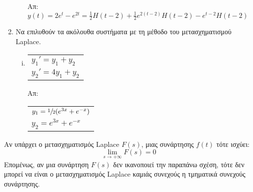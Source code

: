 \begin{enumerate}
\begin{enumerate}[i)]
        \hfill Απ: $y(t)=2e^t-e^{2t}=\frac{1}{2}H(t-2)+
        \frac{1}{2}e^{2(t-2)}H(t-2)-e^{t-2}H(t-2)$
    \end{enumerate}

  \item Να επιλυθούν τα ακόλουθα συστήματα με τη μέθοδο του μετασχηματισμού Laplace.
    \begin{enumerate}[i)]
      \item 
        \begin{tabular}{l} 
          $y_1'=y_1+y_2$ \\ $y_2'=4y_1+y_2$
        \end{tabular} 
        \hfill Απ: 
        \begin{tabular}{l} 
          $y_1=\sfrac{1}{2}(e^{3x}+e^{-x})$ \\ $y_2=e^{3x}+e^{-x}$
        \end{tabular}
    \end{enumerate}
\end{enumerate}

\vspace{\baselineskip}


\begin{rem}
Αν υπάρχει ο μετασχηματισμός Laplace $F(s)$, μιας 
συνάρτησης $f(t)$ τότε ισχύει:
\[
  \lim\limits_{s\to+\infty}F(s)=0
\]
Επομένως, αν μια συνάρτηση $F(s)$ δεν ικανοποιεί την παραπάνω σχέση, τότε δεν 
μπορεί να είναι ο μετασχηματισμός Laplace καμιάς συνεχούς η τμηματικά 
συνεχούς συνάρτησης.
\end{rem}


